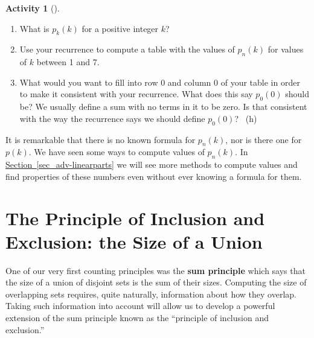 \documentclass[10pt,]{book}
\newcommand{\terminology}[1]{\textbf{#1}}
\theoremstyle{plain}
\theoremstyle{definition}
\theoremstyle{definition}
\theoremstyle{definition}
\newtheorem{activity}[project]{Activity}
\numberwithin{equation}{chapter}
\begin{document}
\begin{activity}[]
\begin{enumerate}[font=\bfseries,label=(\alph*),ref=\alph*]
\item\label{task-222} \hypertarget{p-1158}{}%
What is \(p_k(k)\) for a positive integer \(k\)?%
\item\label{task-223} \hypertarget{p-1160}{}%
Use your recurrence to compute a table with the values of \(p_n(k)\) for values of \(k\) between 1 and 7.%
\item\label{task-224} \hypertarget{p-1161}{}%
What would you want to fill into row 0 and column 0 of your table in order to make it consistent with your recurrence.  What does this say \(p_0(0)\) should be?  We usually define a sum with no terms in it to be zero. Is that consistent with the way the recurrence says we should define \(p_0(0)\)?%
~{\tiny (h)}\end{enumerate}
\end{activity}
\hypertarget{p-1164}{}%
It is remarkable that there is no known formula for \(p_n(k)\), nor is there one for \(p(k)\). We have seen some ways to compute values of \(p_n(k)\).  In \hyperref[sec_adv-linearparts]{Section~\ref{sec_adv-linearparts}} we will see more methods to compute values and find properties of these numbers even without ever knowing a formula for them.%
\typeout{************************************************}
\typeout{************************************************}
\section[{The Principle of Inclusion and Exclusion: the Size of a Union}]{The Principle of Inclusion and Exclusion: the Size of a Union}\label{sec_adv-pie}
\hypertarget{p-1165}{}%
One of our very first counting principles was the \terminology{sum principle} which says that the size of a union of disjoint sets is the sum of their sizes. Computing the size of overlapping sets requires, quite naturally, information about how they overlap. Taking such information into account will allow us to develop a powerful extension of the sum principle known as the ``principle of inclusion and exclusion.''%
\typeout{************************************************}
\typeout{************************************************}
\end{document}
